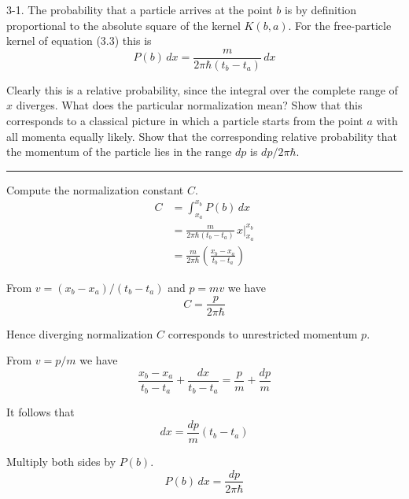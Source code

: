 \documentclass[12pt]{article}
\begin{document}
3-1.
The probability that a particle arrives at the point $b$
is by definition proportional to the absolute square of the kernel
$K(b,a)$.
For the free-particle kernel of equation (3.3) this is
\begin{equation*}
P(b)\,dx=\frac{m}{2\pi\hbar(t_b-t_a)}\,dx
\tag{3.6}
\end{equation*}

Clearly this is a relative probability, since the integral over the
complete range of $x$ diverges.
What does the particular normalization mean?
Show that this corresponds to a classical picture in which a particle
starts from the point $a$ with all momenta equally likely.
Show that the corresponding relative probability that the momentum
of the particle lies in the range $dp$ is $dp/2\pi\hbar$.

\bigskip
\hrule

\bigskip
Compute the normalization constant $C$.
\begin{align*}
C&=\int_{x_a}^{x_b}P(b)\,dx
\\[1ex]
&=\frac{m}{2\pi\hbar(t_b-t_a)}\,x\big|_{x_a}^{x_b}
\\[1ex]
&=\frac{m}{2\pi\hbar}\left(\frac{x_b-x_a}{t_b-t_a}\right)
\end{align*}

From $v=(x_b-x_a)/(t_b-t_a)$ and $p=mv$ we have
\begin{equation*}
C=\frac{p}{2\pi\hbar}
\end{equation*}

\noindent
Hence diverging normalization $C$ corresponds to unrestricted momentum $p$.

\bigskip
\noindent
From $v=p/m$ we have
\begin{equation*}
\frac{x_b-x_a}{t_b-t_a}+\frac{dx}{t_b-t_a}=\frac{p}{m}+\frac{dp}{m}
\end{equation*}

\noindent
It follows that
\begin{equation*}
dx=\frac{dp}{m}(t_b-t_a)
\end{equation*}

\noindent
Multiply both sides by $P(b)$.
\begin{equation*}
P(b)\,dx=\frac{dp}{2\pi\hbar}
\end{equation*}
\end{document}
